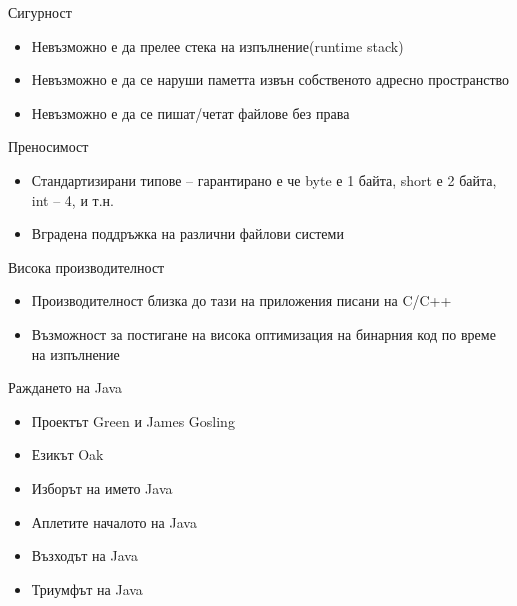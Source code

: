 \documentclass{beamer}
\begin{document}
\begin{frame}{Сигурност}
  \transdissolve  
  \begin{itemize}
   \item Невъзможно е да прелее стека на
    изпълнение(runtime stack)
   \item Невъзможно е да се наруши паметта
    извън собственото адресно
    пространство
   \item Невъзможно е да се пишат/четат
    файлове без права
  \end{itemize}
\end{frame}

\begin{frame}{Преносимост}
  \transdissolve
  \begin{itemize}
  \item Стандартизирани типове – гарантирано
  е че byte е 1 байта, short е 2 байта, int –
  4, и т.н.
  \item Вградена поддръжка на различни
  файлови системи
  \end{itemize}
\end{frame}

\begin{frame}{Висока производителност}
  \transdissolve
  \begin{itemize}
  \item Производителност близка до тази на
  приложения писани на C/C++
  \item Възможност за постигане на висока
  оптимизация на бинарния код по време
  на изпълнение
\end{itemize}
\end{frame}

\begin{frame}{Раждането на Java}
  \transdissolve
  \begin{itemize}
    \item Проектът Green и James Gosling
    \item Езикът Oak
    \item Изборът на името Java
    \item Аплетите началото на Java
    \item Възходът на Java
    \item Триумфът на Java
  \end{itemize}
\end{frame}
\end{document}
